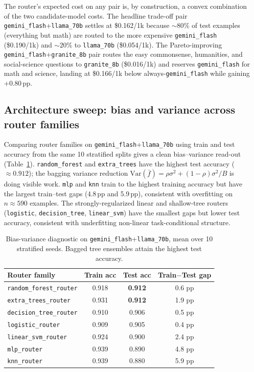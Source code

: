 \documentclass[11pt]{article}
\begin{document}
The router's expected cost on any pair is, by construction, a convex combination of the two candidate-model costs. The headline trade-off pair \texttt{gemini\_flash}+\texttt{llama\_70b} settles at \$0.162/1k because $\sim 80\%$ of test examples (everything but math) are routed to the more expensive \texttt{gemini\_flash} (\$0.190/1k) and $\sim 20\%$ to \texttt{llama\_70b} (\$0.054/1k). The Pareto-improving \texttt{gemini\_flash}+\texttt{granite\_8b} pair routes the easy commonsense, humanities, and social-science questions to \texttt{granite\_8b} (\$0.016/1k) and reserves \texttt{gemini\_flash} for math and science, landing at \$0.166/1k below always-\texttt{gemini\_flash} while gaining $+0.80$\,pp.

\subsection{Architecture sweep: bias and variance across router families}
\label{sec:arch}
Comparing router families on \texttt{gemini\_flash}+\texttt{llama\_70b} using train and test accuracy from the same 10 stratified splits gives a clean bias--variance read-out (Table~\ref{tab:bv}). \texttt{random\_forest} and \texttt{extra\_trees} have the highest test accuracy ($\approx 0.912$); the bagging variance reduction $\mathrm{Var}(\bar f) = \rho\sigma^2 + (1-\rho)\sigma^2/B$ is doing visible work. \texttt{mlp} and \texttt{knn} train to the highest training accuracy but have the largest train--test gaps (4.8\,pp and 5.9\,pp), consistent with overfitting on $n\approx 590$ examples. The strongly-regularized linear and shallow-tree routers (\texttt{logistic}, \texttt{decision\_tree}, \texttt{linear\_svm}) have the smallest gaps but lower test accuracy, consistent with underfitting non-linear task-conditional structure.

\begin{table}[h]
\centering
\small
\begin{tabular}{lccc}
\toprule
Router family            & Train acc & Test acc & Train$-$Test gap \\
\midrule
\texttt{random\_forest\_router}  & 0.918 & \textbf{0.912} & 0.6 pp          \\
\texttt{extra\_trees\_router}    & 0.931 & \textbf{0.912} & 1.9 pp          \\
\texttt{decision\_tree\_router}  & 0.910 & 0.906 & 0.5 pp          \\
\texttt{logistic\_router}        & 0.909 & 0.905 & 0.4 pp          \\
\texttt{linear\_svm\_router}     & 0.924 & 0.900 & 2.4 pp          \\
\texttt{mlp\_router}             & 0.939 & 0.890 & 4.8 pp          \\
\texttt{knn\_router}             & 0.939 & 0.880 & 5.9 pp          \\
\bottomrule
\end{tabular}
\caption{Bias-variance diagnostic on \texttt{gemini\_flash}+\texttt{llama\_70b}, mean over 10 stratified seeds. Bagged tree ensembles attain the highest test accuracy.}
\label{tab:bv}
\end{table}
\end{document}
